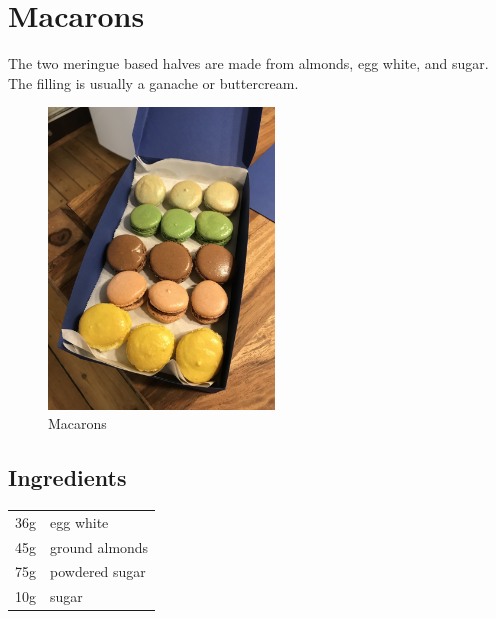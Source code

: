 \section{Macarons}
The two meringue based halves are made from almonds, egg white, and sugar. The filling is usually a ganache or buttercream.

\begin{figure}[!htb]
    \begin{center}
    \includegraphics[width=6cm]{Pictures/Desserts/macarons_1.jpg}
    \caption[Macarons]{Macarons}
    \label{fig:macarons}
    \end{center}
\end{figure}
\subsection{Ingredients}
\begin{tabular}{ l l }
  36g & egg white \\
  45g & ground almonds \\
  75g & powdered sugar \\
  10g & sugar \\
\end{tabular}

